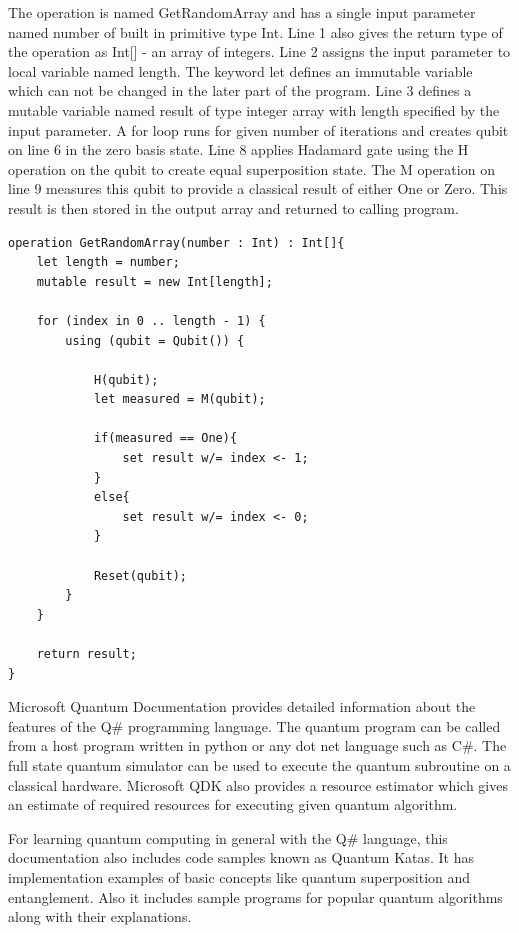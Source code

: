 \documentclass[english,a4paper,11pt,oneside,onecolumn]{book}
\begin{document}
The operation is named GetRandomArray and has a single input parameter named number of built in primitive type Int.  Line 1 also gives the return type of the operation as Int[] - an array of integers. Line 2 assigns the input parameter to local variable named length. The keyword let defines an immutable variable which can not be changed in the later part of the program. Line 3 defines a mutable variable named result of type integer array with length specified by the input parameter. A for loop runs for given number of iterations and creates qubit on line 6 in the zero basis state. Line 8 applies Hadamard gate using the H operation on the qubit to create equal superposition state. The M operation on line 9 measures this qubit to provide a classical result of either One or Zero. This result is then stored in the output array and returned to calling program.

\begin{lstlisting}[caption={Example of Q\# Operation}]
operation GetRandomArray(number : Int) : Int[]{
    let length = number;
    mutable result = new Int[length];

    for (index in 0 .. length - 1) {
        using (qubit = Qubit()) {
            
            H(qubit);
            let measured = M(qubit);
            
            if(measured == One){
                set result w/= index <- 1;
            }
            else{
                set result w/= index <- 0;
            }

            Reset(qubit);
        }
    }
    
    return result;
}
\end{lstlisting}
\BlankLine

Microsoft Quantum Documentation provides detailed information about the features of the Q\# programming language. The quantum program can be called from a host program written in python or any dot net language such as C\#. The full state quantum simulator can be used to execute the quantum subroutine on a classical hardware. Microsoft QDK also provides a resource estimator which gives an estimate of required resources for executing given quantum algorithm.

For learning quantum computing in general with the Q\# language, this documentation also includes code samples known as Quantum Katas. It has implementation examples of basic concepts like quantum superposition and entanglement. Also it includes sample programs for popular quantum algorithms along with their explanations.
\end{document}
